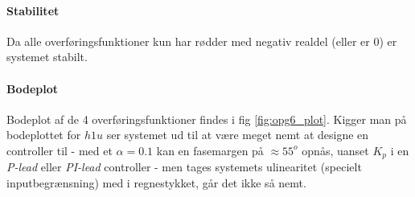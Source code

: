 \paragraph{Stabilitet}
	Da alle overføringsfunktioner kun har rødder med negativ realdel (eller er $0$)
	er systemet stabilt.
\paragraph{Bodeplot}
	Bodeplot af de 4 overføringsfunktioner findes i fig \ref{fig:opg6_plot}. Kigger
	man på bodeplottet for $h1u$ ser systemet ud til at være meget nemt at designe
	en controller til - med et $\alpha = 0.1$ kan en fasemargen på $\approx 55^o$
	opnås, uanset $K_p$ i en \emph{P-lead} eller \emph{PI-lead} controller - men
	tages systemets ulinearitet (specielt inputbegrænsning) med i regnestykket,
	går det ikke så nemt.
	
	
